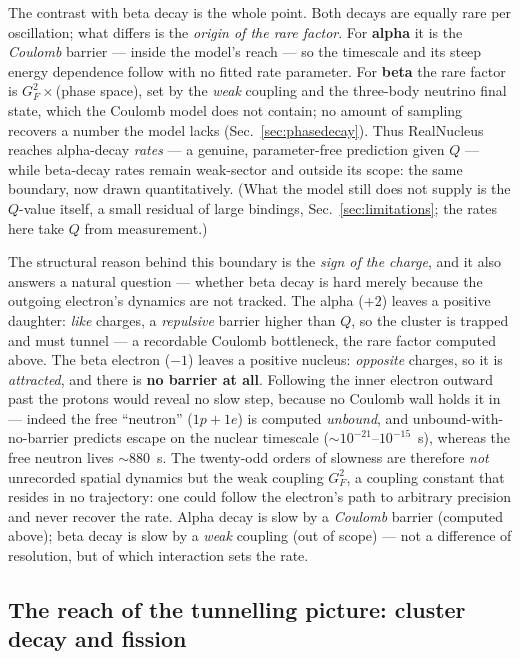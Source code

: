 \documentclass[11pt]{article}
\begin{document}
The contrast with beta decay is the whole point. Both decays are equally rare per oscillation; what differs
is the \emph{origin of the rare factor}. For \textbf{alpha} it is the \emph{Coulomb} barrier --- inside the
model's reach --- so the timescale and its steep energy dependence follow with no fitted rate parameter. For
\textbf{beta} the rare factor is $G_F^2\times$(phase space), set by the \emph{weak} coupling and the
three-body neutrino final state, which the Coulomb model does not contain; no amount of sampling recovers a
number the model lacks (Sec.~\ref{sec:phasedecay}). Thus RealNucleus reaches alpha-decay \emph{rates} --- a
genuine, parameter-free prediction given $Q$ --- while beta-decay rates remain weak-sector and outside its
scope: the same boundary, now drawn quantitatively. (What the model still does not supply is the $Q$-value
itself, a small residual of large bindings, Sec.~\ref{sec:limitations}; the rates here take $Q$ from
measurement.)

The structural reason behind this boundary is the \emph{sign of the charge}, and it also answers a natural
question --- whether beta decay is hard merely because the outgoing electron's dynamics are not tracked. The
alpha ($+2$) leaves a positive daughter: \emph{like} charges, a \emph{repulsive} barrier higher than $Q$, so
the cluster is trapped and must tunnel --- a recordable Coulomb bottleneck, the rare factor computed above.
The beta electron ($-1$) leaves a positive nucleus: \emph{opposite} charges, so it is \emph{attracted}, and
there is \textbf{no barrier at all}. Following the inner electron outward past the protons would reveal no slow
step, because no Coulomb wall holds it in --- indeed the free ``neutron'' ($1p+1e$) is computed \emph{unbound},
and unbound-with-no-barrier predicts escape on the nuclear timescale ($\sim\!10^{-21}$--$10^{-15}$~s), whereas
the free neutron lives $\sim\!880$~s. The twenty-odd orders of slowness are therefore \emph{not} unrecorded
spatial dynamics but the weak coupling $G_F^2$, a coupling constant that resides in no trajectory: one could
follow the electron's path to arbitrary precision and never recover the rate. Alpha decay is slow by a
\emph{Coulomb} barrier (computed above); beta decay is slow by a \emph{weak} coupling (out of scope) --- not a
difference of resolution, but of which interaction sets the rate.

\subsection{The reach of the tunnelling picture: cluster decay and fission}
\label{sec:clusterfission}
\end{document}
